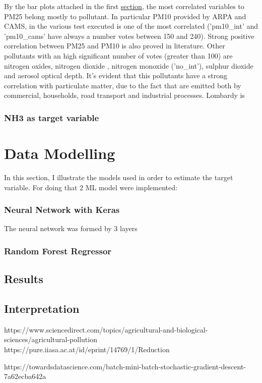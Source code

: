 By the bar plots attached in the first \hyperref[sec:pm25]{section}, the most correlated variables to PM25 belong mostly to pollutant. In particular PM10 provided by ARPA and CAMS, in the various test executed is one of the most correlated ('pm10\_int' and 'pm10\_cams' have always a number votes between 150 and 240). Strong positive correlation between PM25 and PM10 is also proved in literature\cite{zhou2016concentrations}. 
Other pollutants with an high significant number of votes (greater than 100) are nitrogen oxides, nitrogen dioxide , nitrogen monoxide ('no\_int'), sulphur dioxide and aerosol optical depth. It's evident that this pollutants have a strong correlation with particulate matter, due to the fact that are emitted both by commercial, households, road transport and industrial processes\cite{maranzano2022air}.
Lombardy is 

\subsubsection{NH3 as target variable}




\section{Data Modelling}
In this section, I illustrate the models used in order to estimate the target variable. For doing that 2 ML model were implemented:

\subsubsection{Neural Network with Keras}
The neural network was formed by 3 layers
\subsubsection{Random Forest Regressor}

\subsection{Results}
\subsection{Interpretation}

https://www.sciencedirect.com/topics/agricultural-and-biological-sciences/agricultural-pollution 
https://pure.iiasa.ac.at/id/eprint/14769/1/Reduction%

https://towardsdatascience.com/batch-mini-batch-stochastic-gradient-descent-7a62ecba642a